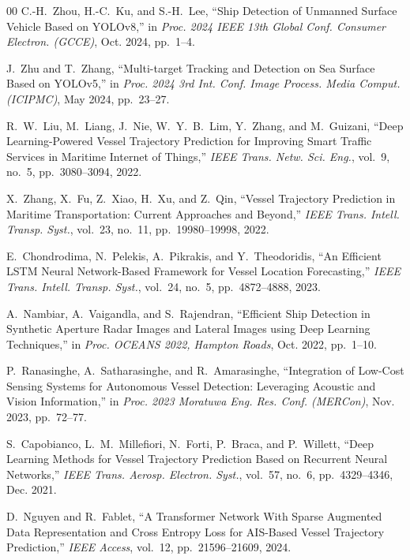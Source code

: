 \documentclass{ieeeaccess}
\begin{document}
\begin{thebibliography}{00}
C.-H.~Zhou, H.-C.~Ku, and S.-H.~Lee,
``Ship Detection of Unmanned Surface Vehicle Based on YOLOv8,''
in \emph{Proc. 2024 IEEE 13th Global Conf. Consumer Electron. (GCCE)},
Oct. 2024, pp.~1--4.

J.~Zhu and T.~Zhang,
``Multi-target Tracking and Detection on Sea Surface Based on YOLOv5,''
in \emph{Proc. 2024 3rd Int. Conf. Image Process. Media Comput.
(ICIPMC)}, May 2024, pp.~23--27.

R.~W.~Liu, M.~Liang, J.~Nie, W.~Y.~B.~Lim, Y.~Zhang,
and M.~Guizani,
``Deep Learning-Powered Vessel Trajectory Prediction for Improving
Smart Traffic Services in Maritime Internet of Things,''
\emph{IEEE Trans. Netw. Sci. Eng.},
vol.~9, no.~5, pp.~3080--3094, 2022.

X.~Zhang, X.~Fu, Z.~Xiao, H.~Xu, and Z.~Qin,
``Vessel Trajectory Prediction in Maritime Transportation: Current
Approaches and Beyond,''
\emph{IEEE Trans. Intell. Transp. Syst.},
vol.~23, no.~11, pp.~19980--19998, 2022.

E.~Chondrodima, N.~Pelekis, A.~Pikrakis, and Y.~Theodoridis,
``An Efficient LSTM Neural Network-Based Framework for Vessel
Location Forecasting,''
\emph{IEEE Trans. Intell. Transp. Syst.},
vol.~24, no.~5, pp.~4872--4888, 2023.


A.~Nambiar, A.~Vaigandla, and S.~Rajendran,
``Efficient Ship Detection in Synthetic Aperture Radar Images and
Lateral Images using Deep Learning Techniques,''
in \emph{Proc. OCEANS 2022, Hampton Roads}, Oct. 2022, pp.~1--10.

P.~Ranasinghe, A.~Satharasinghe, and R.~Amarasinghe,
``Integration of Low-Cost Sensing Systems for Autonomous Vessel
Detection: Leveraging Acoustic and Vision Information,''
in \emph{Proc. 2023 Moratuwa Eng. Res. Conf. (MERCon)},
Nov. 2023, pp.~72--77.

S.~Capobianco, L.~M.~Millefiori, N.~Forti, P.~Braca,
and P.~Willett,
``Deep Learning Methods for Vessel Trajectory Prediction Based on
Recurrent Neural Networks,''
\emph{IEEE Trans. Aerosp. Electron. Syst.},
vol.~57, no.~6, pp.~4329--4346, Dec. 2021.

D.~Nguyen and R.~Fablet,
``A Transformer Network With Sparse Augmented Data Representation
and Cross Entropy Loss for AIS-Based Vessel Trajectory Prediction,''
\emph{IEEE Access},
vol.~12, pp.~21596--21609, 2024.


\end{thebibliography}
\end{document}
